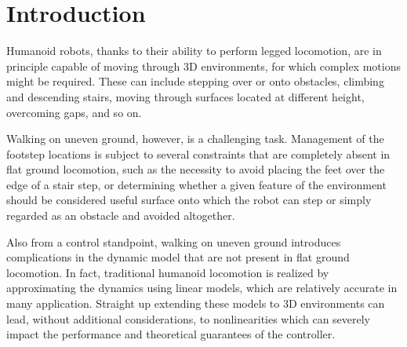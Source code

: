 	
	

\section{Introduction} 
\label{sec:Introduction}

Humanoid robots, thanks to their ability to perform legged locomotion, are in principle capable of moving through 3D environments, for which complex motions might be required. These can include stepping over or onto obstacles, climbing and descending stairs, moving through surfaces located at different height, overcoming gaps, and so on.

Walking on uneven ground, however, is a challenging task. Management of the footstep locations is subject to several constraints that are completely absent in flat ground locomotion, such as the necessity to avoid placing the feet over the edge of a stair step, or determining whether a given feature of the environment should be considered useful surface onto which the robot can step or simply regarded as an obstacle and avoided altogether.

Also from a control standpoint, walking on uneven ground introduces complications in the dynamic model that are not present in flat ground locomotion. In fact, traditional humanoid locomotion is realized by approximating the dynamics using linear models, which are relatively accurate in many application. Straight up extending these models to 3D environments can lead, without additional considerations, to nonlinearities which can severely impact the performance and theoretical guarantees of the controller.

